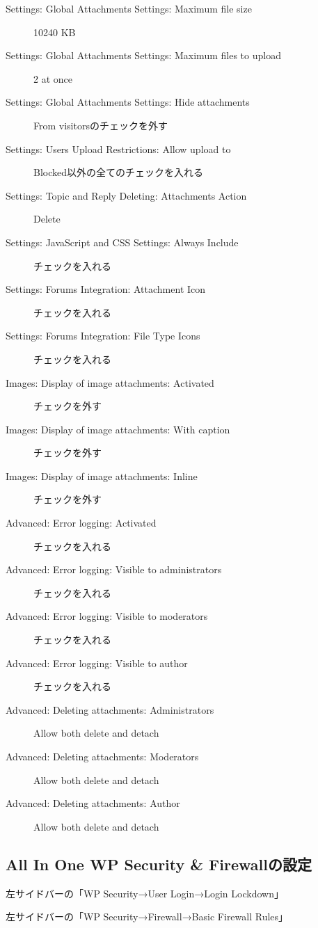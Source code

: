 \documentclass[titlepage,10pt,a4paper,uplatex]{jsbook}
\begin{document}
\begin{description}
\item[Settings: Global Attachments Settings: Maximum file size] 10240 KB
\item[Settings: Global Attachments Settings: Maximum files to upload] 2 at once
\item[Settings: Global Attachments Settings: Hide attachments] From visitorsのチェックを外す
\item[Settings: Users Upload Restrictions: Allow upload to] Blocked以外の全てのチェックを入れる
\item[Settings: Topic and Reply Deleting: Attachments Action] Delete
\item[Settings: JavaScript and CSS Settings: Always Include] チェックを入れる
\item[Settings: Forums Integration: Attachment Icon] チェックを入れる
\item[Settings: Forums Integration: File Type Icons] チェックを入れる
\item[Images: Display of image attachments: Activated] チェックを外す
\item[Images: Display of image attachments: With caption] チェックを外す
\item[Images: Display of image attachments: Inline] チェックを外す
\item[Advanced: Error logging: Activated] チェックを入れる
\item[Advanced: Error logging: Visible to administrators] チェックを入れる
\item[Advanced: Error logging: Visible to moderators] チェックを入れる
\item[Advanced: Error logging: Visible to author] チェックを入れる
\item[Advanced: Deleting attachments: Administrators] Allow both delete and detach
\item[Advanced: Deleting attachments: Moderators] Allow both delete and detach
\item[Advanced: Deleting attachments: Author] Allow both delete and detach
\end{description}

\subsection{All In One WP Security \& Firewallの設定}

左サイドバーの「WP Security→User Login→Login Lockdown」

左サイドバーの「WP Security→Firewall→Basic Firewall Rules」
\end{document}
